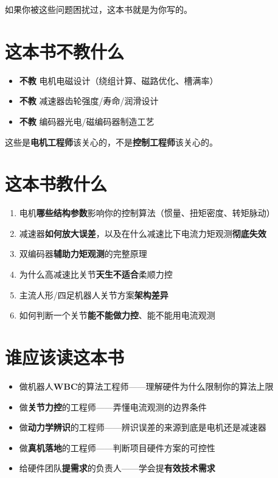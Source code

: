 如果你被这些问题困扰过，这本书就是为你写的。

\section*{这本书不教什么}

\begin{itemize}
  \item \textbf{不教} 电机电磁设计（绕组计算、磁路优化、槽满率）
  \item \textbf{不教} 减速器齿轮强度/寿命/润滑设计
  \item \textbf{不教} 编码器光电/磁编码器制造工艺
\end{itemize}

这些是\textbf{电机工程师}该关心的，不是\textbf{控制工程师}该关心的。

\section*{这本书教什么}

\begin{enumerate}
  \item 电机\textbf{哪些结构参数}影响你的控制算法（惯量、扭矩密度、转矩脉动）
  \item 减速器\textbf{如何放大误差}，以及在什么减速比下电流力矩观测\textbf{彻底失效}
  \item 双编码器\textbf{辅助力矩观测}的完整原理
  \item 为什么高减速比关节\textbf{天生不适合}柔顺力控
  \item 主流人形/四足机器人关节方案\textbf{架构差异}
  \item 如何判断一个关节\textbf{能不能做力控}、能不能用电流观测
\end{enumerate}

\section*{谁应该读这本书}

\begin{itemize}
  \item 做机器人\textbf{WBC}的算法工程师——理解硬件为什么限制你的算法上限
  \item 做\textbf{关节力控}的工程师——弄懂电流观测的边界条件
  \item 做\textbf{动力学辨识}的工程师——辨识误差的来源到底是电机还是减速器
  \item 做\textbf{真机落地}的工程师——判断项目硬件方案的可控性
  \item 给硬件团队\textbf{提需求}的负责人——学会提\textbf{有效技术需求}
\end{itemize}

